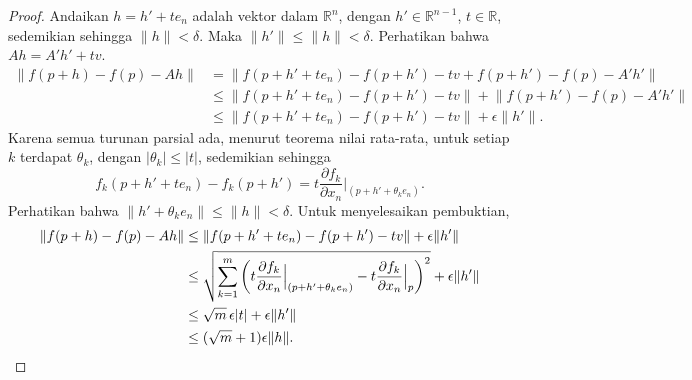 \documentclass[12pt,openany]{book}
\newcommand{\sabs}[1]{\lvert {#1} \rvert}
\newcommand{\snorm}[1]{\lVert {#1} \rVert}
\newcommand{\R}{{\mathbb{R}}}
\theoremstyle{plain}
\theoremstyle{remark}
\theoremstyle{definition}
\theoremstyle{exercise}
\theoremstyle{example}
\begin{document}
\begin{proof}
Andaikan $h = h' + t e_n$ adalah vektor dalam $\R^n$, dengan $h' \in \R^{n-1}$,
$t \in \R$, sedemikian sehingga
$\snorm{h} < \delta$.  Maka $\snorm{h'} \leq \snorm{h} < \delta$.
Perhatikan bahwa $Ah = A' h' + tv$.
\begin{equation*}
\begin{split}
\snorm{f(p+h) - f(p) - Ah}
& = \snorm{f(p+h' + t e_n) - f(p+h') - tv + f(p+h') - f(p) - A' h'}
\\
& \leq \snorm{f(p+h' + t e_n) - f(p+h') -tv} + \snorm{f(p+h') - f(p) -
A' h'}
\\
& \leq \snorm{f(p+h' + t e_n) - f(p+h') -tv} + \epsilon \snorm{h'} .
\end{split}
\end{equation*}
Karena semua turunan parsial ada, menurut teorema nilai rata-rata,
untuk setiap $k$ terdapat $\theta_k$, dengan $\sabs{\theta_k} \leq \sabs{t}$, sedemikian sehingga
\begin{equation*}
f_k(p+h' + t e_n) - f_k(p+h') =
t \frac{\partial f_k}{\partial x_n}\Big|_{(p+h'+\theta_k e_n)}.
\end{equation*}
Perhatikan bahwa $\snorm{h'+\theta_k e_n} \leq \snorm{h} < \delta$.
Untuk menyelesaikan pembuktian,
\begin{equation*}
\begin{split}
\snorm{f(p+h) - f(p) - Ah}
& \leq \snorm{f(p+h' + t e_n) - f(p+h') -tv} + \epsilon \snorm{h'}
\\
& \leq \sqrt{\sum_{k=1}^m
{\left(t\frac{\partial f_k}{\partial x_n}\Big|_{(p+h'+\theta_k e_n)} -
t \frac{\partial f_k}{\partial x_n}\Big|_{p}\right)}^2} + \epsilon \snorm{h'}
\\
& \leq \sqrt{m}\, \epsilon \sabs{t} + \epsilon \snorm{h'}
\\
& \leq (\sqrt{m}+1)\epsilon \snorm{h} . \qedhere
\end{split}
\end{equation*}
\end{proof}
\end{document}

